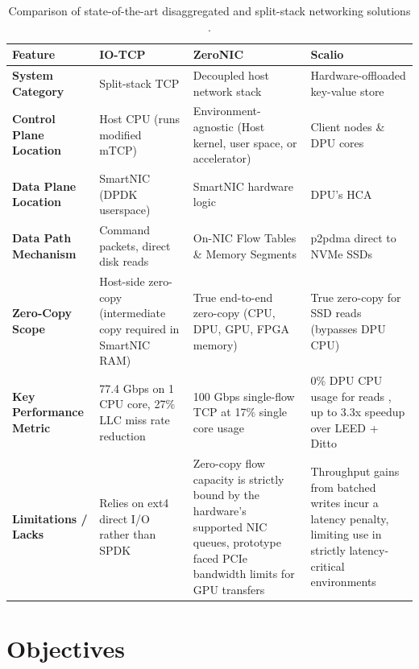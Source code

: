 \begin{table}[H]
\centering
\caption{Comparison of state-of-the-art disaggregated and split-stack networking solutions \cite{kim_rearchitecting_2023, skiadopoulos_high-throughput_2024, sun_scalio_2025}.}
\label{tab:sota_comparison}
\begin{tabularx}{\columnwidth}{@{}p{2.5cm} X X X@{}}
\toprule
\textbf{Feature} & \textbf{IO-TCP} & \textbf{ZeroNIC} & \textbf{Scalio}  \\
\midrule
\midrule
\textbf{System Category} & Split-stack TCP & Decoupled host network stack  & Hardware-offloaded key-value store  \\
\textbf{Control Plane Location} & Host CPU (runs modified mTCP)  & Environment-agnostic (Host kernel, user space, or accelerator)  & Client nodes \& DPU cores \\
\textbf{Data Plane Location} & SmartNIC (DPDK userspace)  & SmartNIC hardware logic  & DPU's HCA  \\
\textbf{Data Path Mechanism} & Command packets, direct disk reads  & On-NIC Flow Tables \& Memory Segments  & \acrshort{p2pdma} direct to NVMe SSDs  \\
\textbf{Zero-Copy Scope} & Host-side zero-copy (intermediate copy required in SmartNIC RAM)  & True end-to-end zero-copy (CPU, DPU, GPU, FPGA memory)  & True zero-copy for SSD reads (bypasses DPU CPU)  \\
\textbf{Key Performance Metric} & 77.4 Gbps on 1 CPU core, 27\% LLC miss rate reduction  & 100 Gbps single-flow TCP at 17\% single core usage  & 0\% DPU CPU usage for reads , up to 3.3x speedup over LEED + Ditto  \\
\textbf{Limitations / Lacks} & Relies on ext4 direct I/O rather than SPDK & Zero-copy flow capacity is strictly bound by the hardware's supported NIC queues, prototype faced PCIe bandwidth limits for GPU transfers & Throughput gains from batched writes incur a latency penalty, limiting use in strictly latency-critical environments \\
\bottomrule
\end{tabularx}
\end{table}

\section{Objectives}


